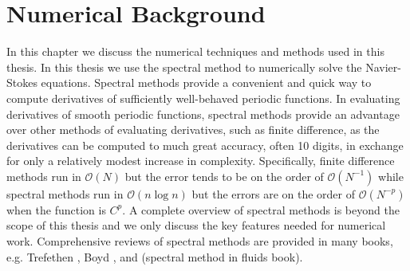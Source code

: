 \chapter{Numerical Background}

In this chapter we discuss the numerical techniques and methods used in this thesis. In this thesis we use the spectral method to numerically solve the Navier-Stokes equations. Spectral methods provide a convenient and quick way to compute derivatives of sufficiently well-behaved periodic functions. In evaluating derivatives of smooth periodic functions, spectral methods provide an advantage over other methods of evaluating derivatives, such as finite difference, as the derivatives can be computed to much great accuracy, often 10 digits, in exchange for only a relatively modest increase in complexity. Specifically, finite difference methods run in $\mathcal{O}(N)$ but the error tends to be on the order of $\mathcal{O}(N^{-1})$ while spectral methods run in $\mathcal{O}(n\log n)$ but the errors are on the order of $\mathcal{O}(N^{-p})$ when the function is $C^{p}$. A complete overview of spectral methods is beyond the scope of this thesis and we only discuss the key features needed for numerical work. Comprehensive reviews of spectral methods are provided in many books, e.g. Trefethen \cite{trefethen_spectral}, Boyd \cite{boyd2001}, and (spectral method in fluids book). 


